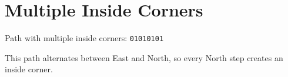 \documentclass{article}
\begin{document}
\section{Multiple Inside Corners}

Path with multiple inside corners: \texttt{01010101}

\begin{center}
\end{center}

This path alternates between East and North, so every North step creates an inside corner.
\end{document}
